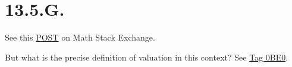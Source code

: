 \section{13.5.G.}

See this \href{https://math.stackexchange.com/questions/1400851/finiteness-of-zeros-and-poles-on-noetherian-schemes}{POST} on Math Stack Exchange.

But what is the precise definition of valuation in this context?
See \href{https://stacks.math.columbia.edu/tag/0BE0}{Tag 0BE0}.